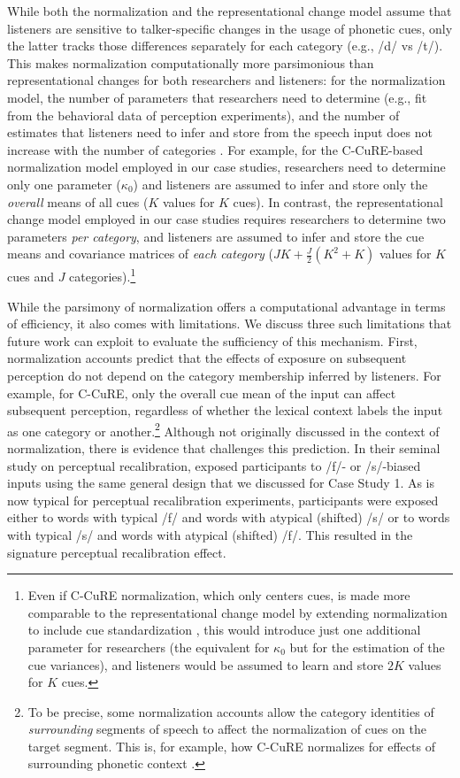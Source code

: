 \documentclass[
  11pt,
  man,floatsintext]{apa6}
\begin{document}
While both the normalization and the representational change model assume that listeners are sensitive to talker-specific changes in the usage of phonetic cues, only the latter tracks those differences separately for each category (e.g., /d/ vs /t/). This makes normalization computationally more parsimonious than representational changes for both researchers and listeners: for the normalization model, the number of parameters that researchers need to determine (e.g., fit from the behavioral data of perception experiments), and the number of estimates that listeners need to infer and store from the speech input does not increase with the number of categories \autocite[for related discussion, see also][]{apfelbaum-mcmurray2015}. For example, for the C-CuRE-based normalization model employed in our case studies, researchers need to determine only one parameter (\(\kappa_0\)) and listeners are assumed to infer and store only the \emph{overall} means of all cues (\(K\) values for \(K\) cues). In contrast, the representational change model employed in our case studies requires researchers to determine two parameters \emph{per category}, and listeners are assumed to infer and store the cue means and covariance matrices of \emph{each category} (\(JK + \frac{J}{2}(K^2+K)\) values for \(K\) cues and \(J\) categories).\footnote{Even if C-CuRE normalization, which only centers cues, is made more comparable to the representational change model by extending normalization to include cue standardization \autocite[also known as z-scoring, as used in, e.g., Lobanov normalization,][]{lobanov1971}, this would introduce just one additional parameter for researchers (the equivalent for \(\kappa_0\) but for the estimation of the cue variances), and listeners would be assumed to learn and store \(2K\) values for \(K\) cues.}

While the parsimony of normalization offers a computational advantage in terms of efficiency, it also comes with limitations. We discuss three such limitations that future work can exploit to evaluate the sufficiency of this mechanism. First, normalization accounts predict that the effects of exposure on subsequent perception do not depend on the category membership inferred by listeners. For example, for C-CuRE, only the overall cue mean of the input can affect subsequent perception, regardless of whether the lexical context labels the input as one category or another.\footnote{To be precise, some normalization accounts allow the category identities of \emph{surrounding} segments of speech to affect the normalization of cues on the target segment. This is, for example, how C-CuRE normalizes for effects of surrounding phonetic context \autocite{mcmurray-jongman2011}.} Although not originally discussed in the context of normalization, there is evidence that challenges this prediction. In their seminal study on perceptual recalibration, \textcite{norris2003} exposed participants to /f/- or /s/-biased inputs using the same general design that we discussed for Case Study 1. As is now typical for perceptual recalibration experiments, participants were exposed either to words with typical /f/ and words with atypical (shifted) /s/ or to words with typical /s/ and words with atypical (shifted) /f/. This resulted in the signature perceptual recalibration effect.
\end{document}
